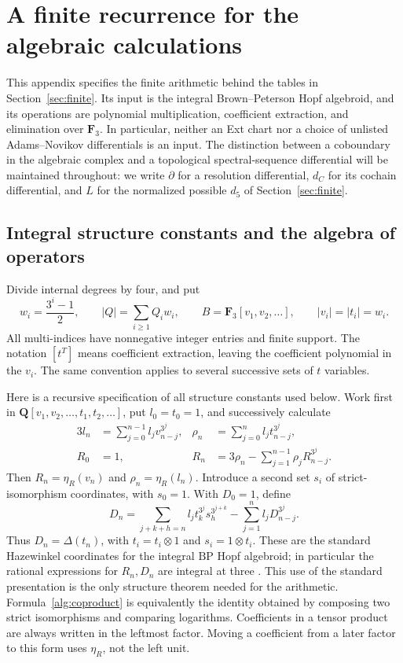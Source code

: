 \documentclass[11pt]{article}
\theoremstyle{definition}
\theoremstyle{remark}
\numberwithin{equation}{section}
\begin{document}
\appendix
\section{A finite recurrence for the algebraic calculations}
\label{app:recurrence}

This appendix specifies the finite arithmetic behind the tables in
Section~\ref{sec:finite}.  Its input is the integral Brown--Peterson Hopf
algebroid, and its operations are polynomial multiplication, coefficient
extraction, and elimination over $\mathbf F_3$.  In particular, neither an Ext
chart nor a choice of unlisted Adams--Novikov differentials is an input.
The distinction between a coboundary in the algebraic complex and a
topological spectral-sequence differential will be maintained throughout:
we write $\partial$ for a resolution differential, $d_C$ for its cochain
differential, and $L$ for the normalized possible $d_5$ of
Section~\ref{sec:finite}.

\subsection{Integral structure constants and the algebra of operators}

Divide internal degrees by four, and put
\[
 w_i=\frac{3^i-1}{2},\qquad
 |Q|=\sum_{i\geq1}Q_iw_i,\qquad
 B=\mathbf F_3[v_1,v_2,\ldots],\qquad |v_i|=|t_i|=w_i.
\]
All multi-indices have nonnegative integer entries and finite support.
The notation $[t^T]$ means coefficient extraction, leaving the coefficient
polynomial in the $v_i$.  The same convention applies to several successive
sets of $t$ variables.

Here is a recursive specification of all structure constants used below.
Work first in $\mathbf Q[v_1,v_2,\ldots,t_1,t_2,\ldots]$, put $l_0=t_0=1$, and
successively calculate
\begin{align}
 3l_n&=\sum_{j=0}^{n-1}l_jv_{n-j}^{3^j},
 &\rho_n&=\sum_{j=0}^{n}l_jt_{n-j}^{3^j},\label{alg:logarithms}\\
 R_0&=1,
 &R_n&=3\rho_n-\sum_{j=1}^{n-1}\rho_jR_{n-j}^{3^j}.
 \label{alg:right-unit}
\end{align}
Then $R_n=\eta_R(v_n)$ and $\rho_n=\eta_R(l_n)$.  Introduce a second set
$s_i$ of strict-isomorphism coordinates, with $s_0=1$.  With $D_0=1$, define
\begin{equation}\label{alg:coproduct}
 D_n=\sum_{j+k+h=n}l_jt_k^{3^j}s_h^{3^{j+k}}
          -\sum_{j=1}^{n}l_jD_{n-j}^{3^j}.
\end{equation}
Thus $D_n=\Delta(t_n)$, with $t_i=t_i\otimes1$ and
$s_i=1\otimes t_i$.  These are the standard Hazewinkel coordinates for
the integral $\mathrm{BP}$ Hopf algebroid; in particular the rational expressions
for $R_n,D_n$ are integral at three
\cite[Theorem~A2.1.27, Equation~(A2.2.1), and Theorem~A2.2.3]{Ravenel}.  This use of the
standard presentation is the only structure theorem needed for the
arithmetic.  Formula~\eqref{alg:coproduct} is equivalently the identity
obtained by composing two strict isomorphisms and comparing logarithms.
Coefficients in a tensor product are always written in the leftmost
factor.  Moving a coefficient from a later factor to this form uses
$\eta_R$, not the left unit.
\end{document}
